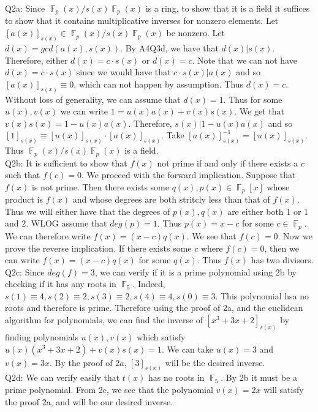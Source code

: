 \documentclass[letterpaper]{article}
\DeclareMathOperator{\F}{\mathbb{F}}
\begin{document}
\noindent Q2a: Since $\F_p(x) / s(x)\F_p(x)$ is a ring, to show that it is a field it suffices to show that it contains multiplicative inverses for nonzero elements. Let $[a(x)]_{s(x)} \in \F_p(x) / s(x)\F_p(x)$ be nonzero. 
Let $d(x) = gcd(a(x),s(x))$. By A4Q3d, we have that $d(x)|s(x)$. Therefore, either $d(x) = c\cdot s(x)$ or $d(x)=c$. Note that we can not have $d(x)=c\cdot s(x)$ since we would have that $c \cdot s(x) | a(x)$ and so $[a(x)]_{s(x)}  \equiv 0$, which can not happen by assumption. Thus $d(x)=c$. Without loss of generality, we can assume that $d(x)=1$. Thus for some $u(x),v(x)$ we can write $1 = u(x)a(x)+ v(x)s(x)$. We get that $v(x)s(x) = 1-u(x)a(x)$. Therefore, $s(x)|1-u(x)a(x)$ and so $[1]_{s(x)}\equiv [u(x)]_{s(x)} \cdot [a(x)]_{s(x)}$. Take $[a(x)]_{s(x)}^{-1} = [u(x)]_{s(x)}$. Thus $\F_p(x) / s(x)\F_p(x)$ is a field. 
\newline \\ Q2b: It is sufficient to show that $f(x)$ not prime if and only if there exists a $c$ such that $f(c)=0$. We proceed with the forward implication. Suppose that $f(x)$ is not prime. Then there exists some $q(x),p(x)\in \F_p[x]$ whose product is $f(x)$ and whose degrees are both stritcly less than that of $f(x)$. Thus we will either have that the degrees of $p(x),q(x)$ are either both 1 or 1 and 2. WLOG assume that $deg(p)=1$. Thus $p(x)=x-c$ for some $c\in \F_p$. We can therefore write $f(x)=(x-c)q(x)$. We see that $f(c)=0$. Now we prove the reverse implication. If there exists some $c$ where $f(c)=0$, then we can write $f(x)=(x-c)q(x)$ for some $q(x)$. Thus $f(x)$ has two divisors. 
\newline \\ Q2c: Since $deg(f)=3$, we can verify if it is a prime polynomial using 2b by checking if it has any roots in $\F_5$. Indeed, $s(1)\equiv 4,s(2)\equiv 2,s(3)\equiv 2,s(4)\equiv 4,s(0)\equiv 3$. This polynomial hsa no roots and therefore is prime. Therefore using the proof of 2a, and the euclidean algorithm for polynomials, we can find the inverse of $[x^3+3x+2]_{s(x)}$ by finding polynomials $u(x),v(x)$ which satisfy $u(x)(x^3+3x+2)+v(x)s(x)=1$. We can take $u(x)=3$ and $v(x)=3x$. By the proof of $2a$, $[3]_{s(x)}$ will be the desired inverse. 
\newline \\ Q2d: We can verify easily that $t(x)$ has no roots in $\F_5$. By 2b it must be a prime polynomial. From 2c, we see that the polynomial $v(x)=2x$ will satisfy the proof 2a, and will be our desired inverse. 
\end{document}
